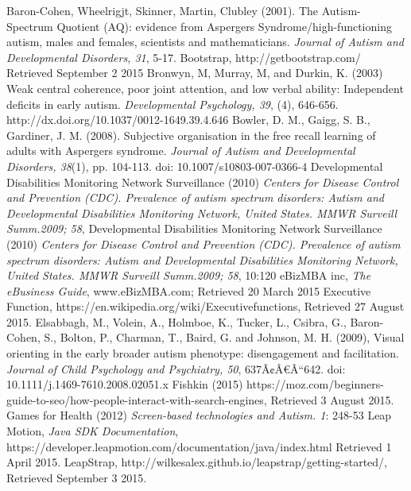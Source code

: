\documentclass[a4paper, 11pt]{article}
\begin{document}
\begin{thebibliography}{100}
 Baron-Cohen, Wheelrigjt, Skinner, Martin, Clubley (2001).  The Autism-Spectrum Quotient (AQ): evidence from Aspergers Syndrome/high-functioning autism, males and females, scientists and mathematicians.  \textit{Journal of Autism and Developmental Disorders, 31}, 5-17.
Bootstrap, http://getbootstrap.com/ Retrieved September 2 2015
 Bronwyn, M, Murray, M, and Durkin, K. (2003) Weak central coherence, poor joint attention, and low verbal ability: Independent deficits in early autism. \textit{Developmental Psychology, 39}, (4), 646-656. http://dx.doi.org/10.1037/0012-1649.39.4.646
 Bowler, D. M., Gaigg, S. B., Gardiner, J. M. (2008). Subjective organisation in the free recall learning of adults with Aspergers syndrome. \textit{Journal of Autism and Developmental Disorders, 38}(1), pp. 104-113. doi: 10.1007/s10803-007-0366-4 
Developmental Disabilities Monitoring Network Surveillance (2010) \textit{Centers for Disease Control and Prevention (CDC). Prevalence of autism spectrum disorders: Autism and Developmental Disabilities Monitoring Network, United States. MMWR Surveill Summ.2009; 58},
Developmental Disabilities Monitoring Network Surveillance (2010) \textit{Centers for Disease Control and Prevention (CDC). Prevalence of autism spectrum disorders: Autism and Developmental Disabilities Monitoring Network, United States. MMWR Surveill Summ.2009; 58}, 10:120
eBizMBA inc, \textit{The eBusiness Guide}, www.eBizMBA.com; Retrieved 20 March 2015
 Executive Function, https://en.wikipedia.org/wiki/Executivefunctions, Retrieved 27 August 2015.
Elsabbagh, M., Volein, A., Holmboe, K., Tucker, L., Csibra, G., Baron-Cohen, S., Bolton, P., Charman, T., Baird, G. and Johnson, M. H. (2009), Visual orienting in the early broader autism phenotype: disengagement and facilitation. \textit{Journal of Child Psychology and Psychiatry, 50}, 637Ã¢Â€Â“642. doi: 10.1111/j.1469-7610.2008.02051.x
 Fishkin (2015) https://moz.com/beginners-guide-to-seo/how-people-interact-with-search-engines, Retrieved 3 August 2015.
 Games for Health (2012) \textit{Screen-based technologies and Autism. 1}: 248-53
 Leap Motion, \textit{Java SDK Documentation}, \\https://developer.leapmotion.com/documentation/java/index.html Retrieved 1 April 2015.
 LeapStrap, http://wilkesalex.github.io/leapstrap/getting-started/, Retrieved September 3 2015.

\end{thebibliography}
\end{document}
